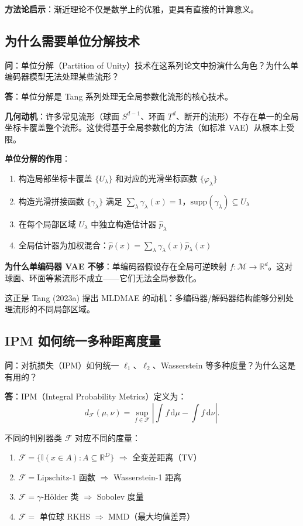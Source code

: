 \textbf{方法论启示}：渐近理论不仅是数学上的优雅，更具有直接的计算意义。

\subsection{为什么需要单位分解技术}\label{sec:qa-partition-of-unity-why}

\textbf{问}：单位分解（Partition of Unity）技术在这系列论文中扮演什么角色？为什么单编码器模型无法处理某些流形？

\textbf{答}：单位分解是 Tang 系列处理无全局参数化流形的核心技术。

\textbf{几何动机}：许多常见流形（球面 $S^{d-1}$、环面 $T^d$、断开的流形）不存在单一的全局坐标卡覆盖整个流形。这使得基于全局参数化的方法（如标准 VAE）从根本上受限。

\textbf{单位分解的作用}：
\begin{enumerate}
    \item 构造局部坐标卡覆盖 $\{U_\lambda\}$ 和对应的光滑坐标函数 $\{\varphi_\lambda\}$
    \item 构造光滑拼接函数 $\{\gamma_\lambda\}$ 满足 $\sum_\lambda \gamma_\lambda(x) = 1$，$\text{supp}(\gamma_\lambda) \subseteq U_\lambda$
    \item 在每个局部区域 $U_\lambda$ 中独立构造估计器 $\hat{p}_\lambda$
    \item 全局估计器为加权混合：$\hat{p}(x) = \sum_\lambda \gamma_\lambda(x) \hat{p}_\lambda(x)$
\end{enumerate}

\textbf{为什么单编码器 VAE 不够}：单编码器假设存在全局可逆映射 $f: \mathcal{M} \to \mathbb{R}^d$。这对球面、环面等紧流形不成立——它们无法全局参数化。

这正是 Tang (2023a) 提出 MLDMAE 的动机：多编码器/解码器结构能够分别处理流形的不同局部区域。

\subsection{IPM 如何统一多种距离度量}\label{sec:qa-ipm-unification}

\textbf{问}：对抗损失（IPM）如何统一 $\ell_1$、$\ell_2$、Wasserstein 等多种度量？为什么这是有用的？

\textbf{答}：IPM（Integral Probability Metrics）定义为：
\[
d_{\mathcal{F}}(\mu,\nu) = \sup_{f \in \mathcal{F}} \left|\int f \, \mathrm{d}\mu - \int f \, \mathrm{d}\nu\right|.
\]

不同的判别器类 $\mathcal{F}$ 对应不同的度量：
\begin{enumerate}
    \item $\mathcal{F} = \{\mathbb{I}(x \in A) : A \subseteq \mathbb{R}^D\}$ $\Rightarrow$ 全变差距离（TV）
    \item $\mathcal{F} = \text{Lipschitz-1 函数}$ $\Rightarrow$ Wasserstein-1 距离
    \item $\mathcal{F} = \gamma$-Hölder 类 $\Rightarrow$ Sobolev 度量
    \item $\mathcal{F} =$ 单位球 RKHS $\Rightarrow$ MMD（最大均值差异）
\end{enumerate}

